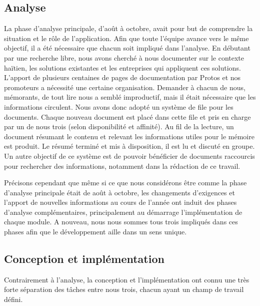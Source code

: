 \documentclass{EPL-master-thesis-covers-FR}
\begin{document}
			\subsection*{Analyse}

				La phase d'analyse principale, d'août à octobre, avait pour but de comprendre la situation et le rôle de l'application. Afin que toute l'équipe avance vers le même objectif, il a été nécessaire que chacun soit impliqué dans l'analyse. En débutant par une recherche libre, nous avons cherché à nous documenter sur le contexte haïtien, les solutions existantes et les entreprises qui appliquent ces solutions. L'apport de plusieurs centaines de pages de documentation par Protos et nos promoteurs a nécessité une certaine organisation. Demander à chacun de nous, mémorants, de tout lire nous a semblé improductif, mais il était nécessaire que les informations circulent. Nous avons donc adopté un système de file pour les documents. Chaque nouveau document est placé dans cette file et pris en charge par un de nous trois (selon disponibilité et affinité). Au fil de la lecture, un document résumant le contenu et relevant les informations utiles pour le mémoire est produit. Le résumé terminé et mis à disposition, il est lu et discuté en groupe. Un autre objectif de ce système est de pouvoir bénéficier de documents raccourcis pour rechercher des informations, notamment dans la rédaction de ce travail.

				Précisons cependant que même si ce que nous considérons être comme la phase d'analyse principale était de août à octobre, les changements d'exigences et l'apport de nouvelles informations au cours de l'année ont induit des phases d'analyse complémentaires, principalement au démarrage l'implémentation de chaque module. A nouveau, nous nous sommes tous trois impliqués dans ces phases afin que le développement aille dans un sens unique.

			\subsection*{Conception et implémentation}

				Contrairement à l'analyse, la conception et l'implémentation ont connu une très forte séparation des tâches entre nous trois, chacun ayant un champ de travail défini.
\end{document}
